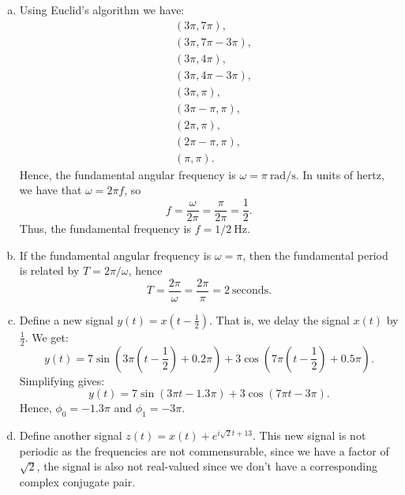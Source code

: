 \begin{enumerate}
\begin{enumerate}[a)]
          \item Using Euclid's algorithm we have:
                \begin{align*}
                   & (3\pi,7\pi),      \\
                   & (3\pi,7\pi-3\pi), \\
                   & (3\pi,4\pi),      \\
                   & (3\pi,4\pi-3\pi), \\
                   & (3\pi,\pi),       \\
                   & (3\pi-\pi,\pi),   \\
                   & (2\pi,\pi),       \\
                   & (2\pi-\pi,\pi),   \\
                   & (\pi,\pi).
                \end{align*}
                Hence, the fundamental angular frequency is $\omega=\pi\ \text{rad/s}$. 
                In units of hertz, we have that $\omega=2\pi f$, so
                \[ f = \frac{\omega}{2\pi}=\frac{\pi}{2\pi}=\frac{1}{2}. \]
                Thus, the fundamental frequency is $f=1/2\ \text{Hz}$.

          \item If the fundamental angular frequency is $\omega=\pi$, then the fundamental period is related by $T=2\pi/\omega$, hence
                \[ T = \frac{2\pi}{\omega}=\frac{2\pi}{\pi}=2\ \text{seconds}. \]

          \item Define a new signal $y(t)=x(t-\frac{1}{2})$. That is, we delay the signal $x(t)$ by $\frac{1}{2}$. We get:
                \[ y(t) = 7\sin(3\pi \left(t-\frac{1}{2}\right)+0.2\pi) + 3\cos(7\pi \left(t-\frac{1}{2}\right)+0.5\pi). \]
                Simplifying gives:
                \[ y(t) = 7\sin(3\pi t-1.3\pi) + 3\cos(7\pi t-3\pi). \]
                Hence, $\phi_{0} = -1.3\pi$ and $\phi_{1}=-3\pi$.

          \item Define another signal $z(t) = x(t) + e^{i\sqrt{2}t+13}$. 
                This new signal is not periodic as the frequencies are not commensurable, since we have a factor of $\sqrt{2}$, 
                the signal is also not real-valued since we don't have a corresponding complex conjugate pair.
        \end{enumerate}


\end{enumerate}
